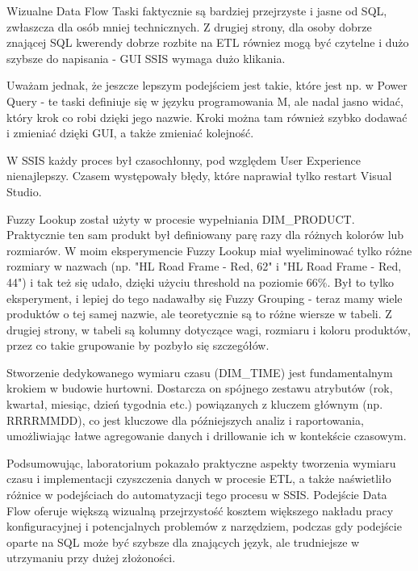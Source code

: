 \documentclass[a4paper,12pt]{article}
\begin{document}
Wizualne Data Flow Taski faktycznie są bardziej przejrzyste i jasne od SQL, zwłaszcza dla osób mniej technicznych. Z drugiej strony, dla osoby dobrze znającej SQL kwerendy dobrze rozbite na ETL równiez mogą być czytelne i dużo szybsze do napisania - GUI SSIS wymaga dużo klikania.

Uważam jednak, że jeszcze lepszym podejściem jest takie, które jest np. w Power Query - te taski definiuje się w języku programowania M, ale nadal jasno widać, który krok co robi dzięki jego nazwie. Kroki można tam również szybko dodawać i zmieniać dzięki GUI, a także zmieniać kolejność.

W SSIS każdy proces był czasochłonny, pod względem User Experience nienajlepszy. Czasem występowały błędy, które naprawiał tylko restart Visual Studio.

Fuzzy Lookup został użyty w procesie wypełniania DIM\_PRODUCT. Praktycznie ten sam produkt był definiowany parę razy dla różnych kolorów lub rozmiarów. W moim eksperymencie Fuzzy Lookup miał wyeliminować tylko różne rozmiary w nazwach (np. "HL Road Frame - Red, 62" i "HL Road Frame - Red, 44") i tak też się udało, dzięki użyciu threshold na poziomie 66\%. Był to tylko eksperyment, i lepiej do tego nadawałby się Fuzzy Grouping - teraz mamy wiele produktów o tej samej nazwie, ale teoretycznie są to różne wiersze w tabeli. Z drugiej strony, w tabeli są kolumny dotyczące wagi, rozmiaru i koloru produktów, przez co takie grupowanie by pozbyło się szczegółów.

Stworzenie dedykowanego wymiaru czasu (DIM\_TIME) jest fundamentalnym krokiem w budowie hurtowni. Dostarcza on spójnego zestawu atrybutów (rok, kwartał, miesiąc, dzień tygodnia etc.) powiązanych z kluczem głównym (np. RRRRMMDD), co jest kluczowe dla późniejszych analiz i raportowania, umożliwiając łatwe agregowanie danych i drillowanie ich w kontekście czasowym.

Podsumowując, laboratorium pokazało praktyczne aspekty tworzenia wymiaru czasu i implementacji czyszczenia danych w procesie ETL, a także naświetliło różnice w podejściach do automatyzacji tego procesu w SSIS. Podejście Data Flow oferuje większą wizualną przejrzystość kosztem większego nakładu pracy konfiguracyjnej i potencjalnych problemów z narzędziem, podczas gdy podejście oparte na SQL może być szybsze dla znających język, ale trudniejsze w utrzymaniu przy dużej złożoności.

\printbibliography
\end{document}
